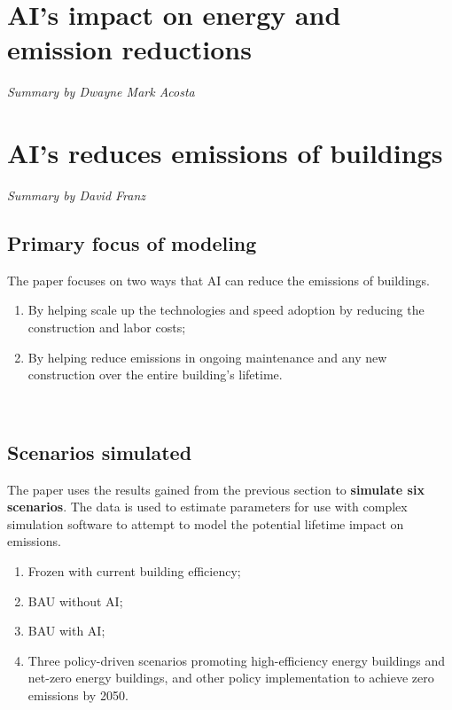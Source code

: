 \documentclass[conference,a4paper]{IEEEtran}
\begin{document}
\section*{AI's impact on energy and emission reductions}
\textit{Summary by Dwayne Mark Acosta}

\section*{AI's reduces emissions of buildings}
\textit{Summary by David Franz}

\subsection*{Primary focus of modeling}

The paper focuses on two ways that AI can reduce the emissions of buildings.

\begin{enumerate}
    \item By helping scale up the technologies and speed adoption by reducing the construction and labor costs;
    \item By helping reduce emissions in ongoing maintenance and any new construction over the entire building's lifetime.
\end{enumerate}

\\

\subsection*{Scenarios simulated}
The paper uses the results gained from the previous section to \textbf{simulate six scenarios}. The data is used to estimate parameters for use with complex simulation software to attempt to model the potential lifetime impact on emissions.
\begin{enumerate}
    \item Frozen with current building efficiency;
    \item BAU without AI;
    \item BAU with AI;
    \item Three policy-driven scenarios promoting high-efficiency energy buildings and net-zero energy buildings, and other policy implementation to achieve zero emissions by 2050.
\end{enumerate}

\\
\end{document}
